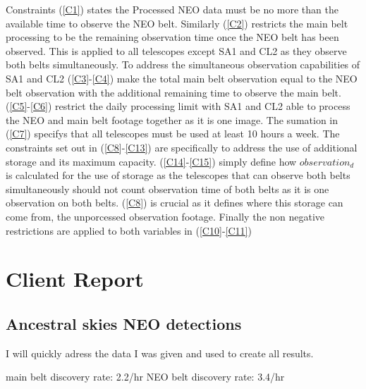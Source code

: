 \documentclass{article}
\begin{document}
	
	Constraints (\ref{C1}) states the Processed NEO data must be no more than the available time to observe the NEO belt.
	Similarly (\ref{C2}) restricts the main belt processing to be the remaining observation time once the NEO belt has been observed. This is applied to all telescopes except SA1 and CL2 as they observe both belts simultaneously.
	To address the simultaneous observation capabilities of SA1 and CL2 (\ref{C3}-\ref{C4}) make the total main belt observation equal to the NEO belt observation with the additional remaining time to observe the main belt.
	(\ref{C5}-\ref{C6}) restrict the daily processing limit with SA1 and CL2 able to process the NEO and main belt footage together as it is one image.
	The sumation in (\ref{C7}) specifys that all telescopes must be used at least 10 hours a week.
	The constraints set out in (\ref{C8}-\ref{C13}) are specifically to address the use of additional storage and its maximum capacity. 
	(\ref{C14}-\ref{C15}) simply define how $observation_{d}$ is calculated for the use of storage as the telescopes that can observe 
	both belts simultaneously should not count observation time of both belts as it is one observation on both belts.
	(\ref{C8}) is crucial as it defines where this storage can come from, the unporcessed observation footage.
	Finally the non negative restrictions are applied to both variables in (\ref{C10}-\ref{C11})

\newpage
\section*{Client Report}
\subsection*{Ancestral skies NEO detections}
I will quickly adress the data I was given and used to create all results.

main belt discovery rate: 2.2/hr
NEO belt discovery rate: 3.4/hr
\end{document}
